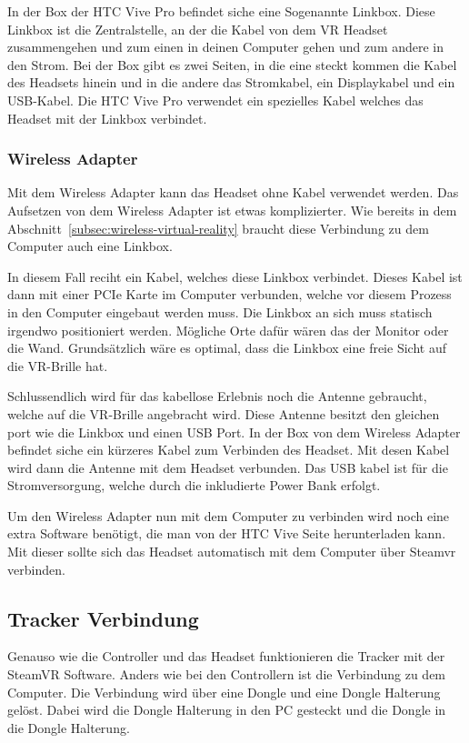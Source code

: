 In der Box der HTC Vive Pro befindet siche eine Sogenannte Linkbox.
Diese Linkbox ist die Zentralstelle, an der die Kabel von dem VR Headset zusammengehen und zum einen in deinen Computer gehen und zum andere in den Strom.
Bei der Box gibt es zwei Seiten, in die eine steckt kommen die Kabel des Headsets hinein und in die andere das Stromkabel, ein Displaykabel und ein USB-Kabel.
Die HTC Vive Pro verwendet ein spezielles Kabel welches das Headset mit der Linkbox verbindet.

\subsubsection{Wireless Adapter}

Mit dem Wireless Adapter kann das Headset ohne Kabel verwendet werden.
Das Aufsetzen von dem Wireless Adapter ist etwas komplizierter.
Wie bereits in dem Abschnitt~\ref{subsec:wireless-virtual-reality} braucht diese Verbindung zu dem Computer auch eine Linkbox.

In diesem Fall reciht ein Kabel, welches diese Linkbox verbindet.
Dieses Kabel ist dann mit einer PCIe Karte im Computer verbunden, welche vor diesem Prozess in den Computer eingebaut werden muss.
Die Linkbox an sich muss statisch irgendwo positioniert werden.
Mögliche Orte dafür wären das der Monitor oder die Wand.
Grundsätzlich wäre es optimal, dass die Linkbox eine freie Sicht auf die VR-Brille hat.

Schlussendlich wird für das kabellose Erlebnis noch die Antenne gebraucht, welche auf die VR-Brille angebracht wird.
Diese Antenne besitzt den gleichen port wie die Linkbox und einen USB Port.
In der Box von dem Wireless Adapter befindet siche ein kürzeres Kabel zum Verbinden des Headset.
Mit desen Kabel wird dann die Antenne mit dem Headset verbunden.
Das USB kabel ist für die Stromversorgung, welche durch die inkludierte Power Bank erfolgt.

Um den Wireless Adapter nun mit dem Computer zu verbinden wird noch eine extra Software benötigt, die man von der HTC Vive Seite herunterladen kann.
Mit dieser sollte sich das Headset automatisch mit dem Computer über Steamvr verbinden.

\subsection{Tracker Verbindung}

Genauso wie die Controller und das Headset funktionieren die Tracker mit der SteamVR Software.
Anders wie bei den Controllern ist die Verbindung zu dem Computer.
Die Verbindung wird über eine Dongle und eine Dongle Halterung gelöst.
Dabei wird die Dongle Halterung in den PC gesteckt und die Dongle in die Dongle Halterung.

